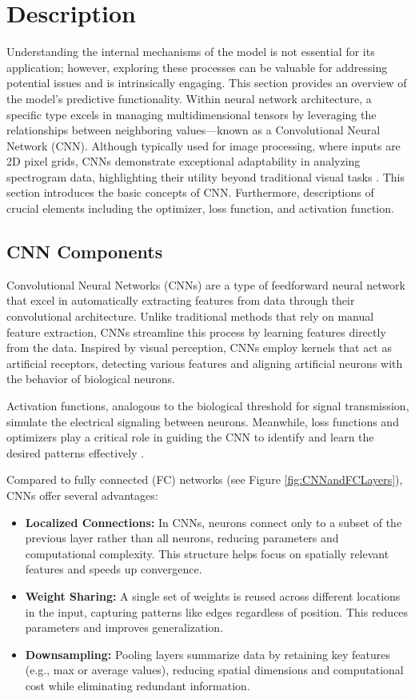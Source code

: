 \section{Description}

Understanding the internal mechanisms of the model is not essential for its application; however, exploring these processes can be valuable for addressing potential issues and is intrinsically engaging. This section provides an overview of the model's predictive functionality. Within neural network architecture, a specific type excels in managing multidimensional tensors by leveraging the relationships between neighboring values—known as a Convolutional Neural Network (CNN). Although typically used for image processing, where inputs are 2D pixel grids, CNNs demonstrate exceptional adaptability in analyzing spectrogram data, highlighting their utility beyond traditional visual tasks \cite{Warden:2020}.
This section introduces the basic concepts of CNN. Furthermore, descriptions of crucial elements including the optimizer, loss function, and activation function.

\subsection{CNN Components}

Convolutional Neural Networks (CNNs) are a type of feedforward neural network that excel in automatically extracting features from data through their convolutional architecture. Unlike traditional methods that rely on manual feature extraction, CNNs streamline this process by learning features directly from the data. Inspired by visual perception, CNNs employ kernels that act as artificial receptors, detecting various features and aligning artificial neurons with the behavior of biological neurons. 

Activation functions, analogous to the biological threshold for signal transmission, simulate the electrical signaling between neurons. Meanwhile, loss functions and optimizers play a critical role in guiding the CNN to identify and learn the desired patterns effectively \cite{Li:2021}.

Compared to fully connected (FC) networks (see Figure \ref{fig:CNNandFCLayers}), CNNs offer several advantages:

\begin{itemize}
	\item \textbf{Localized Connections:} In CNNs, neurons connect only to a subset of the previous layer rather than all neurons, reducing parameters and computational complexity. This structure helps focus on spatially relevant features and speeds up convergence.
	\item \textbf{Weight Sharing:} A single set of weights is reused across different locations in the input, capturing patterns like edges regardless of position. This reduces parameters and improves generalization.
	\item \textbf{Downsampling:} Pooling layers summarize data by retaining key features (e.g., max or average values), reducing spatial dimensions and computational cost while eliminating redundant information.
\end{itemize}



